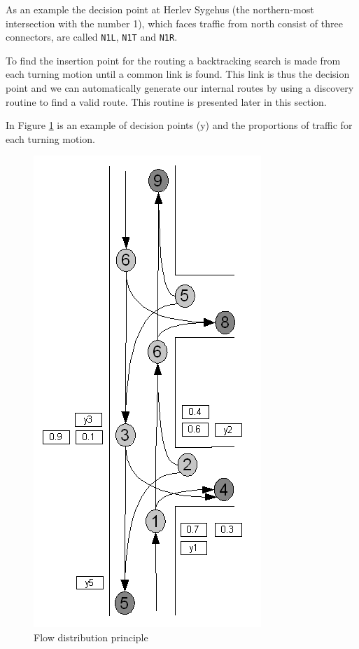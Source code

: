 As an example the decision point at Herlev Sygehus (the northern-most intersection with the number 1), which faces traffic from north consist of three connectors, are called \verb|N1L|, \verb|N1T| and \verb|N1R|.

To find the insertion point for the routing a backtracking search is made from each turning motion until a common link is found. This link is thus the decision point and we can automatically generate our internal routes by using a discovery routine to find a valid route. This routine is presented later in this section.

In Figure \ref{fig:flow_dist_principle} is an example of decision points (y) and the proportions of traffic for each turning motion.
\begin{figure}[htbp]
\centering
\includegraphics[scale=0.4]{trafficcount_to_routes_sketch.png} 
\caption{Flow distribution principle}
\label{fig:flow_dist_principle}
\end{figure}

